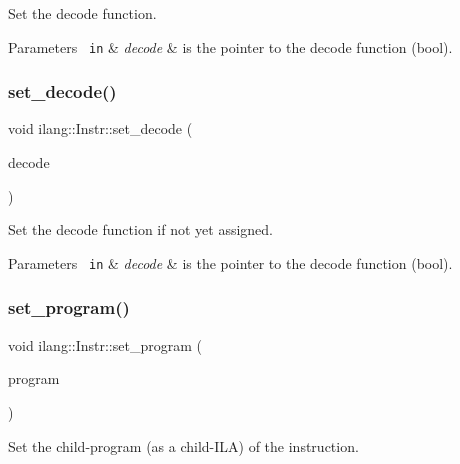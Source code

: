 Set the decode function. 


\begin{DoxyParams}[1]{Parameters}
\mbox{\texttt{ in}}  & {\em decode} & is the pointer to the decode function (bool). \\
\hline
\end{DoxyParams}
\mbox{\label{classilang_1_1_instr_aab1827c6605186d0f2a71635dea19285}} 
\subsubsection{\texorpdfstring{set\+\_\+decode()}{set\_decode()}}
{\footnotesize\ttfamily void ilang\+::\+Instr\+::set\+\_\+decode (\begin{DoxyParamCaption}\item[{const \mbox{\hyperlink{namespaceilang_a7c4196c72e53ea4df4b7861af7bc3bce}{Expr\+Ptr}}}]{decode }\end{DoxyParamCaption})}



Set the decode function if not yet assigned. 


\begin{DoxyParams}[1]{Parameters}
\mbox{\texttt{ in}}  & {\em decode} & is the pointer to the decode function (bool). \\
\hline
\end{DoxyParams}
\mbox{\label{classilang_1_1_instr_a6e8812443ce74fef48c07af956d74bac}} 
\subsubsection{\texorpdfstring{set\+\_\+program()}{set\_program()}}
{\footnotesize\ttfamily void ilang\+::\+Instr\+::set\+\_\+program (\begin{DoxyParamCaption}\item[{const \mbox{\hyperlink{classilang_1_1_instr_ab36b0ed04e0c44e66867ed1d61009f12}{Instr\+Lvl\+Abs\+Ptr}}}]{program }\end{DoxyParamCaption})}



Set the child-\/program (as a child-\/\+I\+LA) of the instruction. 


